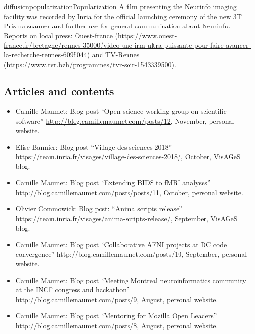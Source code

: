 \documentclass{ra2018}
\begin{document}
\begin{module}{diffusion}{popularization}{Popularization}
A film presenting the Neurinfo imaging facility was recorded by Inria for the official launching ceremony of the new 3T Prisma scanner and further use for general communication about Neurinfo. Reports on local press: Ouest-france (\url{https://www.ouest-france.fr/bretagne/rennes-35000/video-une-irm-ultra-puissante-pour-faire-avancer-la-recherche-rennes-6095044}) and TV-Rennes (\url{https://www.tvr.bzh/programmes/tvr-soir-1543339500}).

\subsection{Articles and contents}
\begin{itemize}
   \item Camille Maumet: Blog post ``Open science working group on scientific software'' \url{http://blog.camillemaumet.com/posts/12}, November, personal website. 
   \item Elise Bannier: Blog post ``Village des sciences 2018'' \url{https://team.inria.fr/visages/village-des-sciences-2018/}, October, VisAGeS blog.  
   \item Camille Maumet: Blog post ``Extending BIDS to fMRI analyses'' \url{http://blog.camillemaumet.com/posts/posts/11}, October, personal website. 
   \item Olivier Commowick: Blog post: ``Anima scripts release'' \url{https://team.inria.fr/visages/anima-scripts-release/}, September, VisAGeS blog.
   \item Camille Maumet: Blog post ``Collaborative AFNI projects at DC code convergence'' \url{http://blog.camillemaumet.com/posts/10}, September, personal website. 
   \item Camille Maumet: Blog post ``Meeting Montreal neuroinformatics community at the INCF congress and hackathon'' \url{http://blog.camillemaumet.com/posts/9}, August, personal website. 
   \item Camille Maumet: Blog post ``Mentoring for Mozilla Open Leaders'' \url{http://blog.camillemaumet.com/posts/8}, August, personal website. 

\end{itemize}
\end{module}
\end{document}
